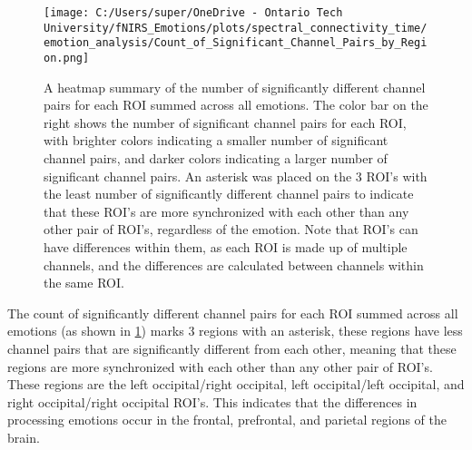 \begin{figure}[H]
  \centering
  \texttt{[image: C:/Users/super/OneDrive - Ontario Tech University/fNIRS\_Emotions/plots/spectral\_connectivity\_time/emotion\_analysis/Count\_of\_Significant\_Channel\_Pairs\_by\_Region.png]}
  \caption[FC: Count of Significantly Different Channel Pairs by ROI]{A heatmap summary of the number of significantly different channel pairs for each ROI summed across all emotions. 
  The color bar on the right shows the number of significant channel pairs for each ROI, with brighter colors indicating a smaller number of significant channel pairs, and darker colors indicating a larger number of significant channel pairs.
  An asterisk was placed on the 3 ROI's with the least number of significantly different channel pairs to indicate that these ROI's are more synchronized with each other than any other pair of ROI's, regardless of the emotion.
  Note that ROI's can have differences within them, as each ROI is made up of multiple channels, and the differences are calculated between channels within the same ROI.}
  \label{fig:fc_region_summary_analysis}
\end{figure}

The count of significantly different channel pairs for each ROI summed across all emotions (as shown in \ref{fig:fc_region_summary_analysis}) marks 3 regions with an asterisk, these regions have less channel pairs that are significantly different from each other, meaning that these regions are more synchronized with each other than any other pair of ROI's.
These regions are the left occipital/right occipital, left occipital/left occipital, and right occipital/right occipital ROI's.
This indicates that the differences in processing emotions occur in the frontal, prefrontal, and parietal regions of the brain.

